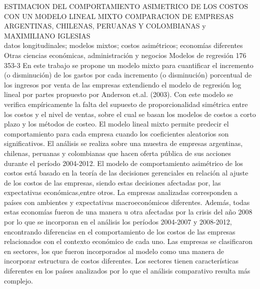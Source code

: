 \A
{ESTIMACION DEL COMPORTAMIENTO ASIMETRICO DE LOS COSTOS CON UN MODELO LINEAL MIXTO COMPARACION DE EMPRESAS ARGENTINAS, CHILENAS, PERUANAS Y COLOMBIANAS}
{ y MAXIMILIANO IGLESIAS}
{
\\}
{datos longitudinales; modelos mixtos; costos asimétricos; economías diferentes} 
 {Otras ciencias económicas, administración y negocios} 
 {Modelos de regresión} 
 {176} 
 {353-3}
{En este trabajo se propone un modelo mixto para cuantificar el incremento (o disminución) de los gastos por cada incremento (o disminución) porcentual de los ingresos por venta de las empresas extendiendo el modelo de regresión log lineal por partes propuesto por Anderson et.al. (2003). Con este modelo se verifica empíricamente la falta del supuesto de proporcionalidad simétrica entre los costos y el nivel de ventas, sobre el cual se basan los modelos de costos a corto plazo y los métodos de costeo. El modelo lineal mixto permite predecir el comportamiento para cada empresa cuando los coeficientes aleatorios son significativos. El análisis se realiza sobre una muestra de empresas argentinas, chilenas, peruanas y colombianas que hacen oferta pública de sus acciones durante el período 2004-2012. El modelo de comportamiento asimétrico de los costos está basado en la teoría de las decisiones gerenciales en relación al ajuste de los costos de las empresas, siendo estas decisiones afectadas por, las expectativas económicas,entre otros. La empresas analizadas corresponden a países con ambientes y expectativas macroeconómicos diferentes. Además, todas estas economías fueron de una manera u otra afectadas por la crisis del año 2008 por lo que se incorporan en el análisis los períodos 2004-2007 y 2008-2012, encontrando diferencias en el comportamiento de los costos de las empresas relacionados con el contexto económico de cada uno. Las empresas se clasificaron en sectores, los que fueron incorporados al modelo como una manera de incorporar estructura de costos diferentes. Los sectores tienen características diferentes en los países analizados por lo que el análisis comparativo resulta más complejo.}
